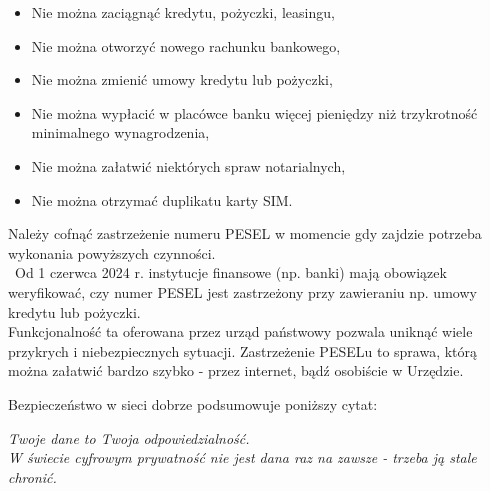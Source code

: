 \begin{itemize}
\begin{itemize}
    \item Nie można zaciągnąć kredytu, pożyczki, leasingu,
    \item Nie można otworzyć nowego rachunku bankowego,
    \item Nie można zmienić umowy kredytu lub pożyczki,
    \item Nie można wypłacić w placówce banku więcej pieniędzy niż trzykrotność minimalnego wynagrodzenia,
    \item Nie można załatwić niektórych spraw notarialnych,
    \item Nie można otrzymać duplikatu karty SIM.
\end{itemize}
Należy cofnąć zastrzeżenie numeru PESEL w momencie gdy zajdzie potrzeba wykonania powyższych czynności.\\\
Od 1 czerwca 2024 r. instytucje finansowe (np. banki) mają obowiązek weryfikować, czy numer PESEL jest zastrzeżony przy zawieraniu np. umowy kredytu lub pożyczki. \\
Funkcjonalność ta oferowana przez urząd państwowy pozwala uniknąć wiele przykrych i niebezpiecznych sytuacji. Zastrzeżenie PESELu to sprawa, którą można załatwić bardzo szybko - przez internet, bądź osobiście w Urzędzie\cite{pesel}.
\end{itemize}

Bezpieczeństwo w sieci dobrze podsumowuje poniższy cytat:
\begin{center}
\textit{Twoje dane to Twoja odpowiedzialność.\\
W świecie cyfrowym prywatność nie jest dana raz na zawsze - trzeba ją stale chronić.}
\end{center}